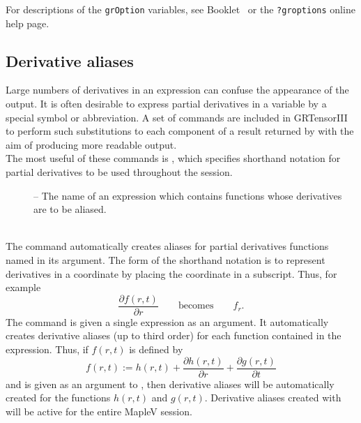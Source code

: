 \documentclass{article}
\begin{document}
For descriptions of the \texttt{grOption} variables, see Booklet 
\grSetupRef~or the \texttt{?groptions} online help page.
%
\subsection{Derivative aliases} \label{sec:alias}
%
Large numbers of derivatives in an expression can confuse the appearance
of the output. It is often desirable to express partial derivatives in
a variable by a special symbol or abbreviation. A set of commands are
included in GRTensorIII to perform such substitutions to each component of a
result returned by  with the aim of producing more readable
output.\\

The most useful of these commands is , which specifies
shorthand notation for partial derivatives to be used throughout the
session.\\
%
\begin{cmdspec}
  \label{spec:autoAlias}

  \begin{description}
    \item[] -- The name of an expression which contains
      functions whose derivatives are to be aliased.
  \end{description}

\end{cmdspec}\\

The  command automatically creates aliases for partial
derivatives functions named in its argument. The form of the shorthand
notation is to represent derivatives in a coordinate by placing the
coordinate in a subscript. Thus, for example
\[
  \frac{\partial f(r,t)}{\partial r} \qquad \text{becomes} \qquad f_r.
\]
The  command is given a single
expression as an argument. It automatically creates derivative aliases 
(up to third order) for each function contained in the expression. Thus,
if $f(r,t)$ is defined by
\[
  f(r,t) := h(r,t) + \frac{\partial h(r,t)}{\partial r} +
    \frac{\partial g(r,t)}{\partial t}
\]
and is given as an argument to , then derivative aliases
will be automatically created for the functions $h(r,t)$ and $g(r,t)$.
Derivative aliases created with  will be active for the
entire MapleV session.
\end{document}
